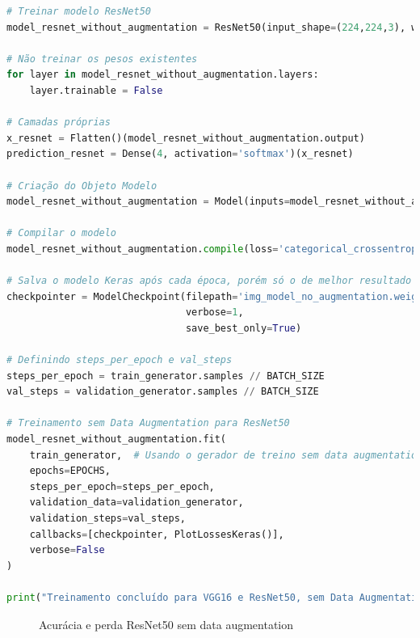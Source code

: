 \begin{lstlisting}[language=Python, style=input]
# Treinar modelo ResNet50
model_resnet_without_augmentation = ResNet50(input_shape=(224,224,3), weights='imagenet', include_top=False)

# Não treinar os pesos existentes
for layer in model_resnet_without_augmentation.layers:
    layer.trainable = False

# Camadas próprias
x_resnet = Flatten()(model_resnet_without_augmentation.output)
prediction_resnet = Dense(4, activation='softmax')(x_resnet)

# Criação do Objeto Modelo
model_resnet_without_augmentation = Model(inputs=model_resnet_without_augmentation.input, outputs=prediction_resnet)

# Compilar o modelo
model_resnet_without_augmentation.compile(loss='categorical_crossentropy', optimizer=RMSprop(learning_rate=0.0001), metrics=['accuracy'])

# Salva o modelo Keras após cada época, porém só o de melhor resultado
checkpointer = ModelCheckpoint(filepath='img_model_no_augmentation.weights.best.keras',
                               verbose=1,
                               save_best_only=True)

# Definindo steps_per_epoch e val_steps
steps_per_epoch = train_generator.samples // BATCH_SIZE
val_steps = validation_generator.samples // BATCH_SIZE

# Treinamento sem Data Augmentation para ResNet50
model_resnet_without_augmentation.fit(
    train_generator,  # Usando o gerador de treino sem data augmentation
    epochs=EPOCHS,
    steps_per_epoch=steps_per_epoch,
    validation_data=validation_generator,
    validation_steps=val_steps,
    callbacks=[checkpointer, PlotLossesKeras()],
    verbose=False
)

print("Treinamento concluído para VGG16 e ResNet50, sem Data Augmentation.")
\end{lstlisting}
\begin{figure}[h!]
\centering
\hspace*{-2cm} %
\caption{Acurácia e perda ResNet50 sem data augmentation}
\end{figure}

